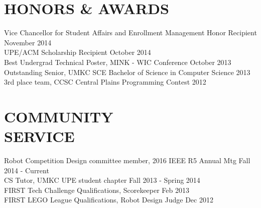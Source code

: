 \documentclass[line,margin]{res}
\begin{document}
\begin{resume}
\section{HONORS \& AWARDS}
		Vice Chancellor for Student Affairs and Enrollment Management Honor Recipient \hfill November 2014\\
		UPE/ACM Scholarship Recipient \hfill October 2014 \\
		Best Undergrad Technical Poster, MINK - WIC Conference \hfill October 2013	\\
		Outstanding Senior, UMKC SCE Bachelor of Science in Computer Science \hfill 2013 \\
		3rd place team, CCSC Central Plains Programming Contest \hfill 2012 
\section{COMMUNITY \\ SERVICE}  
		Robot Competition Design committee member, 2016 IEEE R5 Annual Mtg \hfill Fall 2014 - Current \\  
            	CS Tutor, UMKC UPE student chapter  \hfill Fall 2013 - Spring 2014 \\
                FIRST Tech Challenge Qualifications, Scorekeeper \hfill Feb 2013 \\
		FIRST LEGO League Qualifications, Robot Design Judge \hfill Dec 2012  \\

\end{resume}
\end{document}
